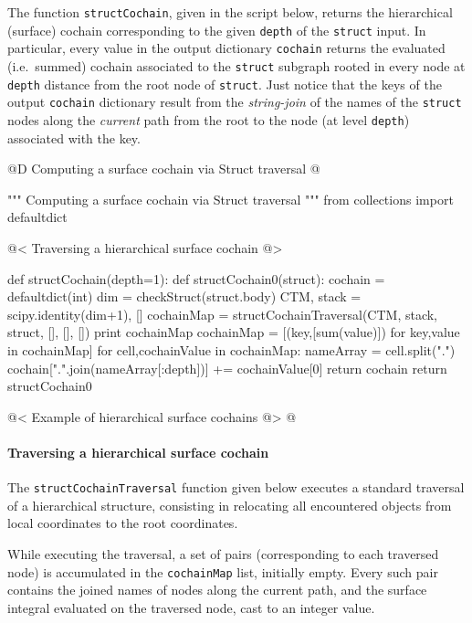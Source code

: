 \documentclass[11pt,oneside]{article}    %
\begin{document}
The function \texttt{structCochain}, given in the script below, returns the hierarchical (surface) cochain corresponding to the given \texttt{depth} of the \texttt{struct} input. In particular, every value in the output dictionary \texttt{cochain} returns the evaluated (i.e.~summed) cochain associated to the \texttt{struct} subgraph rooted in every node at  \texttt{depth} distance from the root node of \texttt{struct}. Just notice that the keys of the output \texttt{cochain} dictionary result from the \emph{string-join} of the names of the \texttt{struct} nodes along the \emph{current} path from the root to the node (at level \texttt{depth}) associated with the key.

@D Computing a surface cochain via Struct traversal
@{""" Computing a surface cochain via Struct traversal """
from collections import defaultdict

@< Traversing a hierarchical surface cochain @>

def structCochain(depth=1):
    def structCochain0(struct):
        cochain = defaultdict(int)
        dim = checkStruct(struct.body)
        CTM, stack = scipy.identity(dim+1), []
        cochainMap = structCochainTraversal(CTM, stack, struct, [], [], []) 
        print cochainMap
        cochainMap = [(key,[sum(value)]) for key,value in cochainMap]
        for cell,cochainValue in cochainMap:
            nameArray = cell.split(".")
            cochain[".".join(nameArray[:depth])] += cochainValue[0]
        return cochain
    return structCochain0
    
@< Example of hierarchical surface cochains @>
@}

\paragraph{Traversing a hierarchical surface cochain}
The \texttt{structCochainTraversal} function given below executes a standard traversal of a hierarchical structure, consisting in relocating all encountered objects from local coordinates to the root coordinates. 

While executing the traversal, a set of pairs (corresponding to each traversed node) is accumulated in the \texttt{cochainMap} list, initially empty. Every such pair contains the joined names of nodes along the current path, and the surface integral evaluated on the traversed node, cast to an integer value. 
\end{document}
